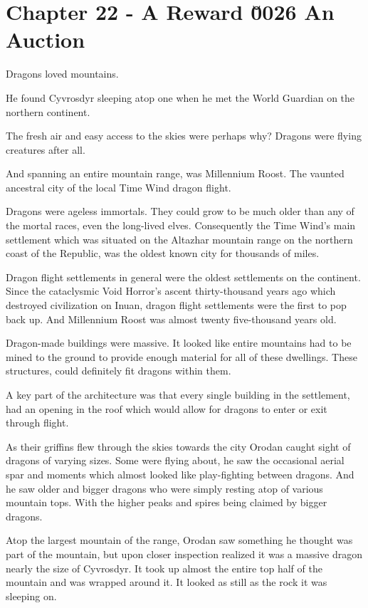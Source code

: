 \documentclass[a4paper,10pt]{book}
\begin{document}
\section*{Chapter 22 - A Reward \u0026 An Auction}
%
\par
Dragons loved mountains.\par
He found Cyvrosdyr sleeping atop one when he met the World Guardian on the northern continent.\par
The fresh air and easy access to the skies were perhaps why? Dragons were flying creatures after all.\par
And spanning an entire mountain range, was Millennium Roost. The vaunted ancestral city of the local Time Wind dragon flight.\par
Dragons were ageless immortals. They could grow to be much older than any of the mortal races, even the long-lived elves. Consequently the Time Wind’s main settlement which was situated on the Altazhar mountain range on the northern coast of the Republic, was the oldest known city for thousands of miles.\par
Dragon flight settlements in general were the oldest settlements on the continent. Since the cataclysmic Void Horror’s ascent thirty-thousand years ago which destroyed civilization on Inuan, dragon flight settlements were the first to pop back up. And Millennium Roost was almost twenty five-thousand years old.\par
Dragon-made buildings were massive. It looked like entire mountains had to be mined to the ground to provide enough material for all of these dwellings. These structures, could definitely fit dragons within them.\par
A key part of the architecture was that every single building in the settlement, had an opening in the roof which would allow for dragons to enter or exit through flight.\par
As their griffins flew through the skies towards the city Orodan caught sight of dragons of varying sizes. Some were flying about, he saw the occasional aerial spar and moments which almost looked like play-fighting between dragons. And he saw older and bigger dragons who were simply resting atop of various mountain tops. With the higher peaks and spires being claimed by bigger dragons.\par
Atop the largest mountain of the range, Orodan saw something he thought was part of the mountain, but upon closer inspection realized it was a massive dragon nearly the size of Cyvrosdyr. It took up almost the entire top half of the mountain and was wrapped around it. It looked as still as the rock it was sleeping on.\par
\end{document}
